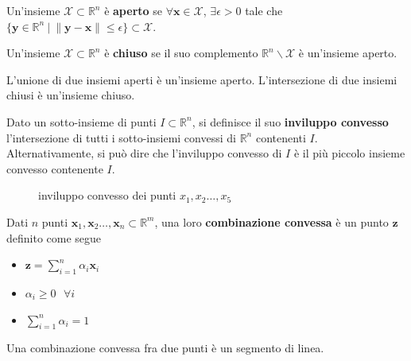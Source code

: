 \documentclass[10pt, letterpaper]{report}
\begin{document}
\begin{definizione}
    Un'insieme $\mathcal X\subset \mathbb R^n$ è \textbf{aperto} se $\forall \mathbf x\in \mathcal X$, $\exists \epsilon >0$ tale che $\{\mathbf y\in \mathbb R^n \ | \ \|\mathbf y-\mathbf x\|\le \epsilon   \}\subset \mathcal X$.
\end{definizione}
\begin{definizione}
    Un'insieme $\mathcal X\subset \mathbb R^n$ è \textbf{chiuso} se il suo complemento $\mathbb R^n \backslash \mathcal X$ è un'insieme aperto.
\end{definizione}
\begin{osservazione}
    L'unione di due insiemi aperti è un'insieme aperto. L'intersezione di due insiemi chiusi è un'insieme chiuso.
\end{osservazione}
\begin{definizione}
    Dato un sotto-insieme di punti  $I\subset \mathbb R^n$, si definisce il suo \textbf{inviluppo convesso} l'intersezione di tutti i sotto-insiemi convessi di $\mathbb R^n$ contenenti $I$. Alternativamente, si può dire che l'inviluppo convesso di $I$ è il più piccolo insieme convesso contenente $I$.
\end{definizione}
\begin{figure}[h]\label{fig:solEsempio2}
    \caption{inviluppo convesso dei punti $x_1,x_2\dots,x_5$}
\end{figure}
\begin{definizione}
    Dati $n$ punti $\mathbf{x}_1,\mathbf{x}_2\dots ,\mathbf{x}_n\subset \mathbb R^m$, una loro \textbf{combinazione convessa} è un punto $\mathbf{z}$ definito come segue \begin{itemize}
        \item $\displaystyle\mathbf z =  \sum_{i=1}^n\alpha_i\mathbf x_i$
        \item $\alpha_i\ge 0  \ \ \ \forall i$
        \item $\displaystyle  \sum_{i=1}^n\alpha_i=1$
    \end{itemize}
\end{definizione}
\begin{osservazione}
    Una combinazione convessa fra due punti è un segmento di linea.
\end{osservazione}
\end{document}
